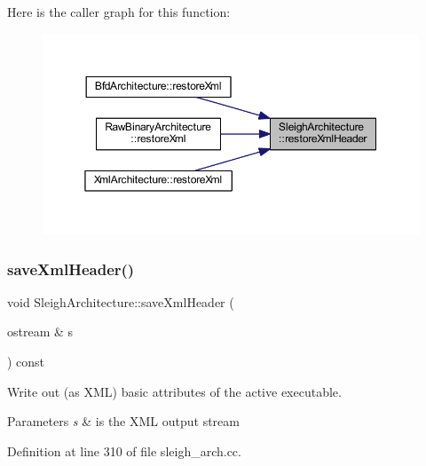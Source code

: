 Here is the caller graph for this function\+:
\nopagebreak
\begin{figure}[H]
\begin{center}
\leavevmode
\includegraphics[width=350pt]{class_sleigh_architecture_a9edbac231d5ec6639f02e5888db24943_icgraph}
\end{center}
\end{figure}
\mbox{\label{class_sleigh_architecture_a0ac133adbc1162fe2baeba1c897dfc34}} 
\subsubsection{\texorpdfstring{saveXmlHeader()}{saveXmlHeader()}}
{\footnotesize\ttfamily void Sleigh\+Architecture\+::save\+Xml\+Header (\begin{DoxyParamCaption}\item[{ostream \&}]{s }\end{DoxyParamCaption}) const}



Write out (as X\+ML) basic attributes of the active executable. 


\begin{DoxyParams}{Parameters}
{\em s} & is the X\+ML output stream \\
\hline
\end{DoxyParams}


Definition at line 310 of file sleigh\+\_\+arch.\+cc.

